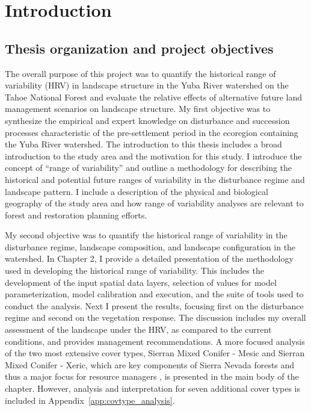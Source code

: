 
\chapter{Introduction} %
\label{CH1}


\section{Thesis organization and project objectives}

The overall purpose of this project was to quantify the historical range of variability (HRV) in landscape structure in the Yuba River watershed on the Tahoe National Forest and evaluate the relative effects of alternative future land management scenarios on landscape structure. My first objective was to synthesize the empirical and expert knowledge on disturbance and succession processes characteristic of the pre-settlement period in the ecoregion containing the Yuba River watershed. The introduction to this thesis includes a broad introduction to the study area and the motivation for this study. I introduce the concept of ``range of variability'' and outline a methodology for describing the historical and potential future ranges of variability in the disturbance regime and landscape pattern. I include a description of the physical and biological geography of the study area and how range of variability analyses are relevant to forest and restoration planning efforts. 

My second objective was to quantify the historical range of variability in the disturbance regime, landscape composition, and landscape configuration in the watershed. In Chapter 2, I provide a detailed presentation of the methodology used in developing the historical range of variability. This includes the development of the input spatial data layers, selection of values for model parameterization, model calibration and execution, and the suite of tools used to conduct the analysis. Next I present the results, focusing first on the disturbance regime and second on the vegetation response. The discussion includes my overall assessment of the landscape under the HRV, as compared to the current conditions, and provides management recommendations. A more focused analysis of the two most extensive cover types, Sierran Mixed Conifer - Mesic and Sierran Mixed Conifer - Xeric, which are key components of Sierra Nevada forests and thus a major focus for resource managers \citep{North2010}, is presented in the main body of the chapter. However, analysis and interpretation for seven additional cover types is included in Appendix~\ref{app:covtype_analysis}. 

